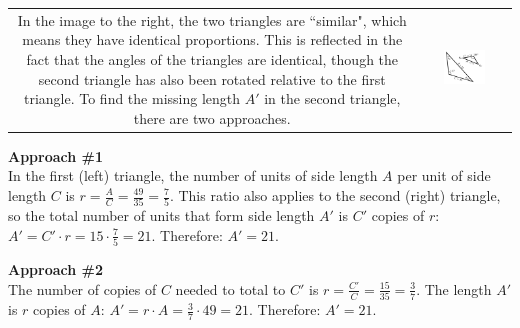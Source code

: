 \documentclass{article}
\begin{document}
\begin{tabular}{cc}
\parbox{0.4\textwidth}{
In the image to the right, the two triangles are ``similar", which means they have identical proportions. This is reflected in the fact that the angles of the triangles are identical, though the second triangle has also been rotated relative to the first triangle. 
To find the missing length \(A'\) in the second triangle, there are two approaches. 
} & 
\parbox{0.5\textwidth}{\includegraphics[width = 0.5\textwidth]{similar_triangles_2}}
\end{tabular}

\textbf{Approach \#1} \\
In the first (left) triangle, the number of units of side length \(A\) per unit of side length \(C\) is \(r = \frac{A}{C} = \frac{49}{35} = \frac{7}{5}\). This ratio also applies to the second (right) triangle, so the total number of units that form side length \(A'\) is \(C'\) copies of \(r\): \(A' = C' \cdot r = 15 \cdot \frac{7}{5} = 21\). Therefore: \(A' = 21\). 

\textbf{Approach \#2} \\
The number of copies of \(C\) needed to total to \(C'\) is \(r = \frac{C'}{C} = \frac{15}{35} = \frac{3}{7}\). The length \(A'\) is \(r\) copies of \(A\): \(A' = r \cdot A = \frac{3}{7} \cdot 49 = 21\). Therefore: \(A' = 21\).
\end{document}
